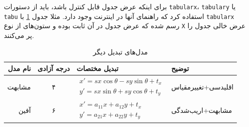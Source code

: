 برای اینکه عرض جدول قابل کنترل باشد، باید از دستورات
\verb|tabularx|،
\verb|tabulary| یا
\verb|tabu|
استفاده کرد که راهنمای آنها در اینترنت وجود دارد.
مثلا جدول
\ref{tab:motionModelsCont}
با
\verb|tabularx|
رسم شده که عرض جدول در آن ثابت بوده و ستون‌های از نوع
\verb|X|
عرض خالی جدول را پر می‌کنند.
\begin{table}[ht]
	\caption{مدل‌های تبدیل دیگر}
	\label{tab:motionModelsCont}
	\centering
	\onehalfspacing
	\begin{tabularx}{\textwidth}{|r|c|l|X|}
		\hline نام مدل & درجه آزادی & تبدیل مختصات & توضیح \\
		\hline مشابهت & ۴ & $\begin{aligned} x'=sx\cos\theta - sy\sin\theta+t_x \\ y'=sx\sin\theta+sy\cos\theta+t_y \end{aligned}$ & اقلیدسی+تغییرمقیاس \\
		\hline آفین & ۶ & $\begin{aligned} x'=a_{11}x+a_{12}y+t_x \\ y'=a_{21}x+a_{22}y+t_y \end{aligned}$ & مشابهت+اریب‌شدگی \\
		\hline
	\end{tabularx}
\end{table}

